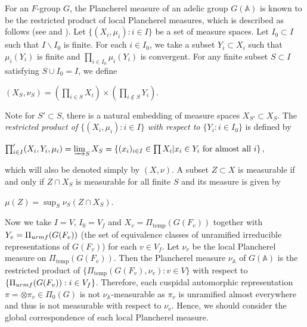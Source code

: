 \documentclass[11pt]{article}
\theoremstyle{plain}
\theoremstyle{remark}
\theoremstyle{definition}
\DeclareMathOperator{\tp}{temp}
\begin{document}
For an $F$-group $G$, the Plancherel measure of an adelic group $G(\mathbb{A})$ is known to be the restricted product of local Plancherel measures, which is described as follows (see \cite{Y24mathZ} and \cite[\S 2]{Blkd77}). 
Let $\{(X_i,\mu_i):i\in I\}$ be a set of measure spaces. 
Let $I_0\subset I$ such that $I\backslash I_0$ is finite. 
For each $i\in I_0$, we take a subset $Y_i\subset X_i$ such that $\mu_{i}(Y_i)$ is finite and $\prod_{i\in I_0}\mu_{i}(Y_i)$ is convergent. 
For any finite subset $S\subset I$ satisfying $S\cup I_{0}=I$, we define
\begin{center}
    $(X_S,\nu_S)=(\prod_{i\in S}X_i)\times (\prod_{i\notin S}Y_i)$. 
\end{center} 
Note for $S'\subset S$, there is a natural embedding of measure spaces $X_{S'}\subset X_S$.
The {\it restricted product of $\{(X_i,\mu_i):i\in I\}$ with respect to $\{Y_i:i\in I_0\}$} is defined by
\begin{center}
$\prod'_{i\in I} (X_i,Y_i,\mu_i)=\varinjlim_S X_S=\{(x_i)_{i\in I}\in \prod X_i|x_i\in Y_i\text{~for~almost~all~}i\}$,
\end{center}
which will also be denoted simply by $(X,\nu)$. 
A subset $Z\subset X$ is measurable if and only if $Z\cap X_S$ is measurable for all finite $S$ and its measure is given by
\begin{center}
    $\mu(Z)=\sup_{S}\nu_S(Z\cap X_S)$.
\end{center} 

Now we take $I=V$, $I_0=V_f$ and $X_v=\Pi_{\tp}(G(F_v))$ together with $Y_v=\Pi_{\rm urmf}(G(F_v))$ (the set of equivalence classes of unramified irreducible representations of $G(F_v)$) for each $v\in V_f$. 
Let $\nu_v$ be the local Plancherel measure on $\Pi_{\tp}(G(F_v))$. 
Then the Plancherel measure $\nu_\mathbb{A}$ of $G(\mathbb{A})$ is the restricted product of $\{\Pi_{\tp}(G(F_v),\nu_v):v\in V\}$ with respect to $\{\Pi_{\rm urmf}(G(F_v)):i\in V_f\}$. 
Therefore, each cuspidal automorphic representation $\pi=\otimes \pi_v \in \Pi_0(G)$ is not $\nu_\mathbb{A}$-measurable as $\pi_v$ is unramified almost everywhere and thus is not measurable with respect to $\nu_v$. 
Hence, we should consider the global correspondence of each local Plancherel measure. 
\end{document}
